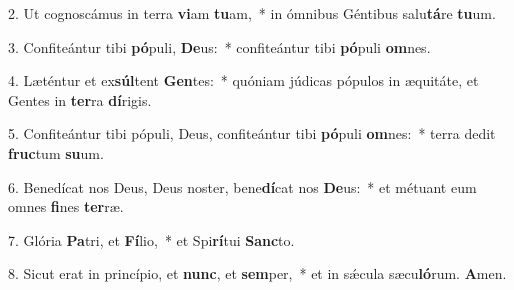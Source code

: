 2. Ut cognoscámus in terra \textbf{vi}am \textbf{tu}am,~* in ómnibus Géntibus salu\textbf{tá}re \textbf{tu}um.

3. Confiteántur tibi \textbf{pó}puli, \textbf{De}us:~* confiteántur tibi \textbf{pó}puli \textbf{om}nes.

4. Læténtur et ex\textbf{súl}tent \textbf{Gen}tes:~* quóniam júdicas pópulos in æquitáte, et Gentes in \textbf{ter}ra \textbf{dí}rigis.

5. Confiteántur tibi pópuli, Deus, confiteántur tibi \textbf{pó}puli \textbf{om}nes:~* terra dedit \textbf{fruc}tum \textbf{su}um.

6. Benedícat nos Deus, Deus noster, bene\textbf{dí}cat nos \textbf{De}us:~* et métuant eum omnes \textbf{fi}nes \textbf{ter}ræ.

7. Glória \textbf{Pa}tri, et \textbf{Fí}lio,~* et Spi\textbf{rí}tui \textbf{Sanc}to.

8. Sicut erat in princípio, et \textbf{nunc}, et \textbf{sem}per,~* et in s\'{\ae}cula sæcu\textbf{ló}rum. \textbf{A}men.